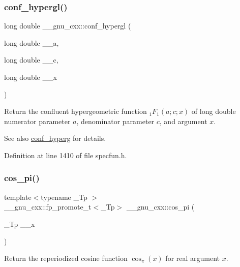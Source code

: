 \subsubsection{\texorpdfstring{conf\+\_\+hypergl()}{conf\_hypergl()}}
{\footnotesize\ttfamily long double \+\_\+\+\_\+gnu\+\_\+cxx\+::conf\+\_\+hypergl (\begin{DoxyParamCaption}\item[{long double}]{\+\_\+\+\_\+a,  }\item[{long double}]{\+\_\+\+\_\+c,  }\item[{long double}]{\+\_\+\+\_\+x }\end{DoxyParamCaption})\hspace{0.3cm}{\ttfamily [inline]}}

Return the confluent hypergeometric function $ {}_1F_1(a;c;x) $ of {\ttfamily long double} numerator parameter $ a $, denominator parameter $ c $, and argument $ x $.

\begin{DoxySeeAlso}{See also}
\hyperlink{group__gnu__math__spec__func_ga4d01e85e7d295afca5d9f8b6c68f19cc}{conf\+\_\+hyperg} for details. 
\end{DoxySeeAlso}


Definition at line 1410 of file specfun.\+h.

\mbox{\label{group__gnu__math__spec__func_gafc4698ae591b0e9e61285b0794d43ef4}} 
\subsubsection{\texorpdfstring{cos\+\_\+pi()}{cos\_pi()}}
{\footnotesize\ttfamily template$<$typename \+\_\+\+Tp $>$ \\
\+\_\+\+\_\+gnu\+\_\+cxx\+::fp\+\_\+promote\+\_\+t$<$\+\_\+\+Tp$>$ \+\_\+\+\_\+gnu\+\_\+cxx\+::cos\+\_\+pi (\begin{DoxyParamCaption}\item[{\+\_\+\+Tp}]{\+\_\+\+\_\+x }\end{DoxyParamCaption})\hspace{0.3cm}{\ttfamily [inline]}}

Return the reperiodized cosine function $ \cos_\pi(x) $ for real argument $ x $.


